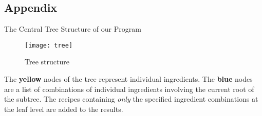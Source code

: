 \documentclass[fontsize=11pt]{article}
\begin{document}

    \newpage
    \begin{center}
        \section*{Appendix}

        \Large{The Central Tree Structure of our Program}
    \end{center}

    \vspace{10 mm}

    \begin{figure}[h] %
        \centering
        \texttt{[image: tree]}
        \caption{Tree structure}
        \label{fig:tree_stctr}
    \end{figure}

    \begin{center}
        The \textbf{yellow} nodes of the tree represent individual ingredients. The \textbf{blue} nodes are a list of combinations of individual ingredients involving the current root of the subtree. The recipes containing \emph{only} the specified ingredient combinations at the leaf level are added to the results.
    \end{center}
\end{document}
